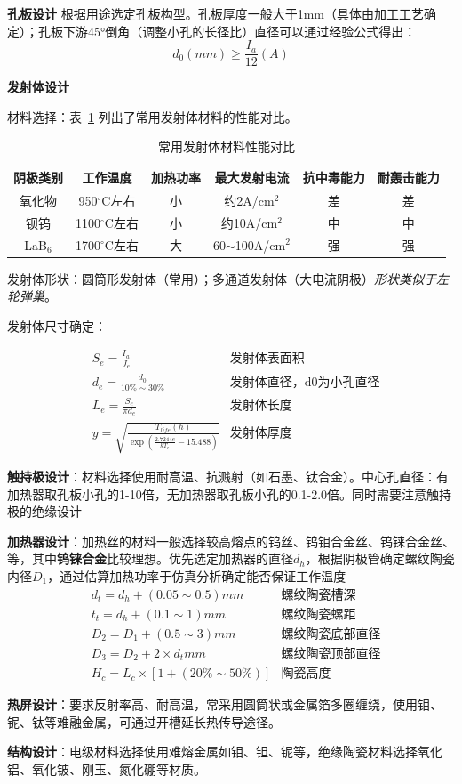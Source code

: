     \textbf{孔板设计}
      根据用途选定孔板构型。孔板厚度一般大于1mm（具体由加工工艺确定）；孔板下游45°倒角（调整小孔的长径比）直径可以通过经验公式得出：
      \begin{equation}
        d_0(mm) \ge \frac{I_a}{12}(A)
      \end{equation}

    \textbf{发射体设计}
      
    材料选择：表~\ref{tab:emitter_materials} 列出了常用发射体材料的性能对比。

    \begin{table}[htbp]
      \centering
      \caption{常用发射体材料性能对比}
      \label{tab:emitter_materials}
      \renewcommand{\arraystretch}{1.1}
      \begin{tabular}{cccccc}
        \toprule
        阴极类别 & 工作温度 & 加热功率 & 最大发射电流 & 抗中毒能力 & 耐轰击能力 \\
        \midrule
        氧化物 & 950$^\circ$C左右 & 小 & 约2A/cm$^2$ & 差 & 差 \\
        钡钨 & 1100$^\circ$C左右 & 小 & 约10A/cm$^2$ & 中 & 中 \\
        LaB$_6$ & 1700$^\circ$C左右 & 大 & 60$\sim$100A/cm$^2$ & 强 & 强 \\
        \bottomrule
      \end{tabular}
    \end{table}

    发射体形状：圆筒形发射体（常用）；多通道发射体（大电流阴极）\textit{形状类似于左轮弹巢}。

    发射体尺寸确定：
    
    \begin{align}
      & S_e = \frac{I_a}{J_e} & \text{发射体表面积}\\
      & d_e = \frac{d_0}{10\% \sim 30 \%} & \text{发射体直径，d0为小孔直径}\\
      & L_e = \frac{S_e}{\pi d_e} & \text{发射体长度}\\
      & y = \sqrt{\frac {T_{life}(h)} { \exp \left( \frac{2.7244 e}{k T_e} - 15.488 \right)}} & \text{发射体厚度}
    \end{align}
    

    \textbf{触持极设计}：材料选择使用耐高温、抗溅射（如石墨、钛合金）。中心孔直径：有加热器取孔板小孔的1-10倍，无加热器取孔板小孔的0.1-2.0倍。同时需要注意触持极的绝缘设计

    \textbf{加热器设计}：加热丝的材料一般选择较高熔点的钨丝、钨钼合金丝、钨铼合金丝、等，其中\textbf{钨铼合金}比较理想。优先选定加热器的直径$d_h$，根据阴极管确定螺纹陶瓷内径$D_1$，通过估算加热功率于仿真分析确定能否保证工作温度
    \begin{align}
      & d_t = d_h +(0.05 \sim 0.5) mm & \text{螺纹陶瓷槽深}\\
      & t_t = d_h + (0.1 \sim 1) mm & \text{螺纹陶瓷螺距}\\
      & D_2 = D_1 + (0.5 \sim 3) mm & \text{螺纹陶瓷底部直径}\\
      & D_3 = D_2 + 2 \times d_t mm & \text{螺纹陶瓷顶部直径}\\
      & H_c = L_c \times [1 + (20 \% \sim 50 \%)] & \text{陶瓷高度}
    \end{align}

    \textbf{热屏设计}：要求反射率高、耐高温，常采用圆筒状或金属箔多圈缠绕，使用钼、铌、钛等难融金属，可通过开槽延长热传导途径。

    \textbf{结构设计}：电级材料选择使用难熔金属如钼、钽、铌等，绝缘陶瓷材料选择氧化铝、氧化铍、刚玉、氮化硼等材质。